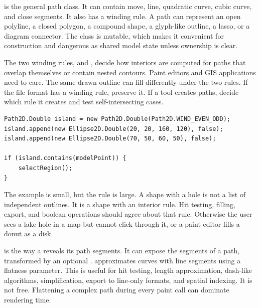  is the general path class. It can contain move, line, quadratic curve, cubic curve, and close segments. It also has a winding rule. A path can represent an open polyline, a closed polygon, a compound shape, a glyph-like outline, a lasso, or a diagram connector. The class is mutable, which makes it convenient for construction and dangerous as shared model state unless ownership is clear.

The two winding rules,  and , decide how interiors are computed for paths that overlap themselves or contain nested contours. Paint editors and GIS applications need to care. The same drawn outline can fill differently under the two rules. If the file format has a winding rule, preserve it. If a tool creates paths, decide which rule it creates and test self-intersecting cases.

\begin{lstlisting}[caption={Building a compound path with an explicit winding rule.}]
Path2D.Double island = new Path2D.Double(Path2D.WIND_EVEN_ODD);
island.append(new Ellipse2D.Double(20, 20, 160, 120), false);
island.append(new Ellipse2D.Double(70, 50, 60, 50), false);

if (island.contains(modelPoint)) {
    selectRegion();
}
\end{lstlisting}

The example is small, but the rule is large. A shape with a hole is not a list of independent outlines. It is a shape with an interior rule. Hit testing, filling, export, and boolean operations should agree about that rule. Otherwise the user sees a lake hole in a map but cannot click through it, or a paint editor fills a donut as a disk.

 is the way a  reveals its path segments. It can expose the segments of a path, transformed by an optional .  approximates curves with line segments using a flatness parameter. This is useful for hit testing, length approximation, dash-like algorithms, simplification, export to line-only formats, and spatial indexing. It is not free. Flattening a complex path during every paint call can dominate rendering time.

